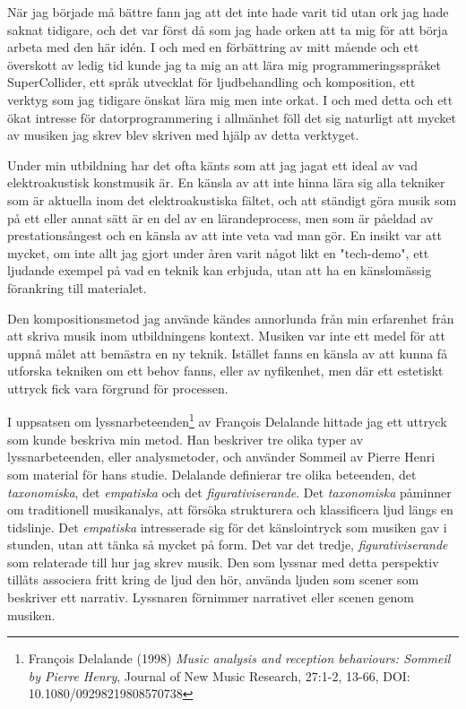 \documentclass{article}
\begin{document}
När jag började må bättre fann jag att det inte hade varit tid utan ork jag hade saknat tidigare, och det var
först då som jag hade orken att ta mig för att börja arbeta med den här idén. I och med en förbättring av
mitt mående och ett överskott av ledig tid kunde jag ta mig an att lära mig programmeringsspråket
SuperCollider, ett språk utvecklat för ljudbehandling och komposition, ett verktyg som jag
tidigare önskat lära mig men inte orkat. I och med detta och ett ökat intresse för datorprogrammering i
allmänhet föll det sig naturligt att mycket av musiken jag skrev blev skriven med hjälp av detta verktyget.

Under min utbildning har det ofta känts som att jag jagat ett ideal av vad elektroakustisk konstmusik är. En
känsla av att inte hinna lära sig alla tekniker som är aktuella inom det elektroakustiska fältet, och att
ständigt göra musik som på ett eller annat sätt är en del av en lärandeprocess, men som är påeldad av
prestationsångest och en känsla av att inte veta vad man gör. En insikt var att mycket, om inte allt jag gjort
under åren varit något likt en "tech-demo", ett ljudande exempel på vad en teknik kan erbjuda, utan att ha en
känslomässig förankring till materialet.

Den kompositionsmetod jag använde kändes annorlunda från min erfarenhet från att skriva musik inom
utbildningens kontext. Musiken var inte ett medel för att uppnå målet att bemästra en ny teknik. Istället
fanns en känsla av att kunna få utforska tekniken om ett behov fanns, eller av nyfikenhet, men där ett
estetiskt uttryck fick vara förgrund för processen. 

I uppsatsen om lyssnarbeteenden\footnote{François Delalande (1998) \emph{Music analysis and reception
behaviours: Sommeil by Pierre Henry}, Journal of New Music Research, 27:1-2, 13-66, DOI:
10.1080/09298219808570738} av François Delalande hittade jag ett uttryck som kunde beskriva min metod. Han
beskriver tre olika typer av lyssnarbeteenden, eller analysmetoder, och använder Sommeil av Pierre Henri som
material för hans studie. Delalande definierar tre olika beteenden, det \emph{taxonomiska}, det
\emph{empatiska} och det \emph{figurativiserande}. Det \emph{taxonomiska} påminner om traditionell
musikanalys, att försöka strukturera och klassificera ljud längs en tidslinje. Det \emph{empatiska}
intresserade sig för det känslointryck som musiken gav i stunden, utan att tänka så mycket på form. Det var
det tredje, \emph{figurativiserande} som relaterade till hur jag skrev musik. Den som lyssnar med detta
perspektiv tillåts associera fritt kring de ljud den hör, använda ljuden som scener som beskriver ett
narrativ. Lyssnaren förnimmer narrativet eller scenen genom musiken. 
\end{document}
